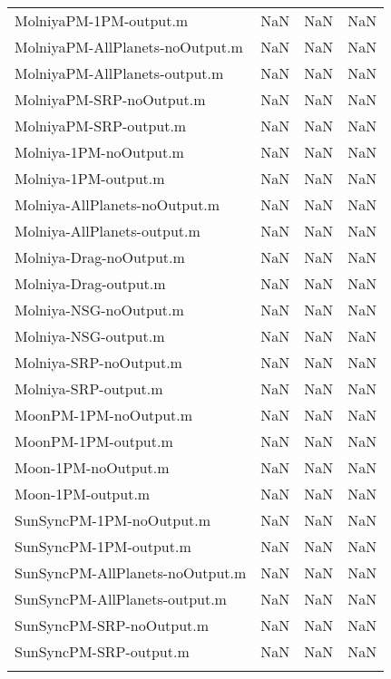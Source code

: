 \begin{table}[htbp!]
\begin{tabular}{lccc}
         MolniyaPM-1PM-output.m & NaN & NaN & NaN \\
         MolniyaPM-AllPlanets-noOutput.m & NaN & NaN & NaN \\
         MolniyaPM-AllPlanets-output.m & NaN & NaN & NaN \\
         MolniyaPM-SRP-noOutput.m & NaN & NaN & NaN \\
         MolniyaPM-SRP-output.m & NaN & NaN & NaN \\
         Molniya-1PM-noOutput.m & NaN & NaN & NaN \\
         Molniya-1PM-output.m & NaN & NaN & NaN \\
         Molniya-AllPlanets-noOutput.m & NaN & NaN & NaN \\
         Molniya-AllPlanets-output.m & NaN & NaN & NaN \\
         Molniya-Drag-noOutput.m & NaN & NaN & NaN \\
         Molniya-Drag-output.m & NaN & NaN & NaN \\
         Molniya-NSG-noOutput.m & NaN & NaN & NaN \\
         Molniya-NSG-output.m & NaN & NaN & NaN \\
         Molniya-SRP-noOutput.m & NaN & NaN & NaN \\
         Molniya-SRP-output.m & NaN & NaN & NaN \\
         MoonPM-1PM-noOutput.m & NaN & NaN & NaN \\
         MoonPM-1PM-output.m & NaN & NaN & NaN \\
         Moon-1PM-noOutput.m & NaN & NaN & NaN \\
         Moon-1PM-output.m & NaN & NaN & NaN \\
         SunSyncPM-1PM-noOutput.m & NaN & NaN & NaN \\
         SunSyncPM-1PM-output.m & NaN & NaN & NaN \\
         SunSyncPM-AllPlanets-noOutput.m & NaN & NaN & NaN \\
         SunSyncPM-AllPlanets-output.m & NaN & NaN & NaN \\
         SunSyncPM-SRP-noOutput.m & NaN & NaN & NaN \\
         SunSyncPM-SRP-output.m & NaN & NaN & NaN \\
      \hline\hline
      \label{Table: Performance4-2} 
\end{tabular}
\end{table}
